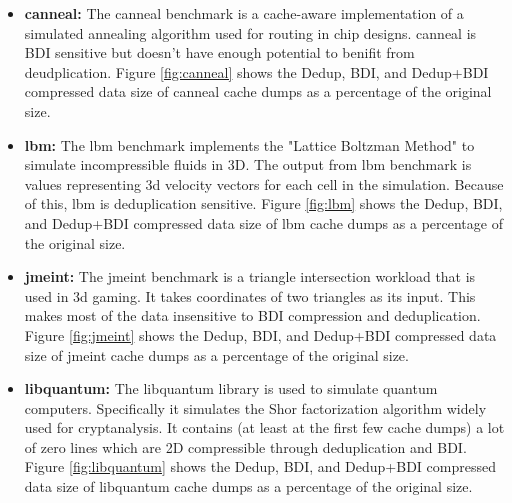 \begin{itemize}
    \item \textbf{canneal:} The canneal benchmark\cite{parsec} is a cache-aware implementation of a simulated annealing algorithm used for routing in chip designs. canneal is BDI sensitive but doesn't have enough potential to benifit from deudplication. Figure \ref{fig:canneal} shows the Dedup, BDI, and Dedup+BDI compressed data size of canneal cache dumps as a percentage of the original size.
    \item \textbf{lbm:} The lbm benchmark\cite{spec} implements the "Lattice Boltzman Method" to simulate incompressible fluids in 3D. The output from lbm benchmark is values representing 3d velocity vectors for each cell in the simulation. Because of this, lbm is deduplication sensitive. Figure \ref{fig:lbm} shows the Dedup, BDI, and Dedup+BDI compressed data size of lbm cache dumps as a percentage of the original size.
    \item \textbf{jmeint:} The jmeint benchmark\cite{axbench} is a triangle intersection workload that is used in 3d gaming. It takes coordinates of two triangles as its input. This makes most of the data insensitive to BDI compression and deduplication. Figure \ref{fig:jmeint} shows the Dedup, BDI, and Dedup+BDI compressed data size of jmeint cache dumps as a percentage of the original size.
    \item \textbf{libquantum:} The libquantum library\cite{spec} is used to simulate quantum computers. Specifically it simulates the Shor factorization algorithm widely used for cryptanalysis. It contains (at least at the first few cache dumps) a lot of zero lines which are 2D compressible through deduplication and BDI. Figure \ref{fig:libquantum} shows the Dedup, BDI, and Dedup+BDI compressed data size of libquantum cache dumps as a percentage of the original size.
\end{itemize}
